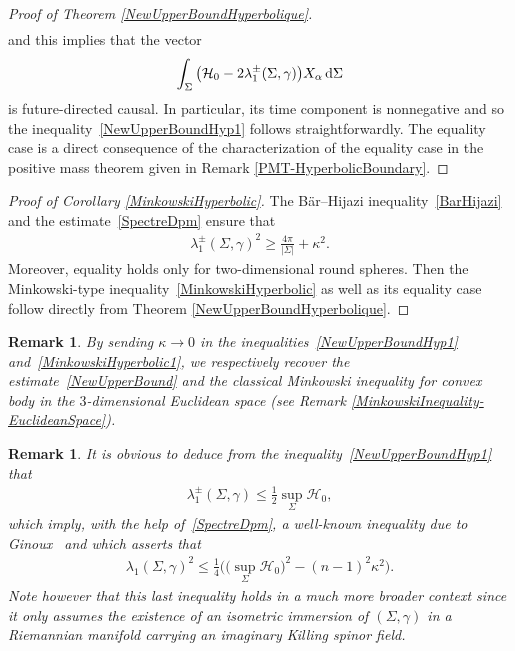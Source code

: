\documentclass[pdftex]{sigma}
\numberwithin{equation}{section}
\newtheorem{Remark}[Theorem]{Remark}
\begin{document}
\begin{proof}[Proof of Theorem \ref{NewUpperBoundHyperbolique}]
\begin{gather*}
\end{gather*}
and this implies that the vector
\begin{gather*}
\int_{\Sigma}\big(\mathcal{H}_{0}-2\lambda_1^\pm(\Sigma,\gamma)\big)X_\alpha\,{\rm d}\Sigma
\end{gather*}
is future-directed causal. In particular, its time component is nonnegative and so the inequality~\eqref{NewUpperBoundHyp1} follows straightforwardly. The equality case is a direct consequence of the characterization of the equality case in the positive mass theorem given in Remark \ref{PMT-HyperbolicBoundary}.
\end{proof}


\begin{proof}[Proof of Corollary \ref{MinkowskiHyperbolic}]
The B\"ar--Hijazi inequality~\eqref{BarHijazi} and the estimate~\eqref{SpectreDpm} ensure that
\begin{gather*}
\lambda^\pm_1(\Sigma,\gamma)^2\geq\frac{4\pi}{|\Sigma|}+\kappa^2.
\end{gather*}
Moreover, equality holds only for two-dimensional round spheres. Then the Minkowski-type inequality~\eqref{MinkowskiHyperbolic} as well as its equality case follow directly from Theorem \ref{NewUpperBoundHyperbolique}.
\end{proof}

\begin{Remark}
By sending $\kappa\rightarrow 0$ in the inequalities~\eqref{NewUpperBoundHyp1} and~\eqref{MinkowskiHyperbolic1}, we respectively recover the estimate~\eqref{NewUpperBound} and the classical Minkowski inequality for convex body in the $3$-dimensional Euclidean space (see Remark \ref{MinkowskiInequality-EuclideanSpace}).
\end{Remark}

\begin{Remark}
It is obvious to deduce from the inequality~\eqref{NewUpperBoundHyp1} that
\begin{gather*}
\lambda_1^\pm(\Sigma,\gamma)\leq\frac{1}{2}\sup_\Sigma\mathcal{H}_0,
\end{gather*}
which imply, with the help of~\eqref{SpectreDpm}, a well-known inequality due to Ginoux~\cite{Ginoux2} and which asserts that
\begin{gather*}
\lambda_1(\Sigma,\gamma)^2\leq\frac{1}{4}\big(\big(\sup_\Sigma\mathcal{H}_0\big)^2-(n-1)^2\kappa^2\big).
\end{gather*}
Note however that this last inequality holds in a much more broader context since it only assumes the existence of an isometric immersion of $(\Sigma,\gamma)$ in a Riemannian manifold carrying an imaginary Killing spinor field.
\end{Remark}
\end{document}
